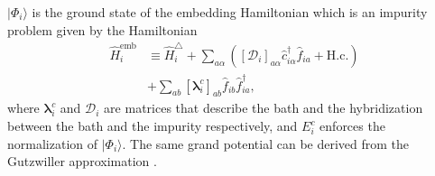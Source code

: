 \documentclass[reprint,aps,prb,amsmath,amssymb]{revtex4-2}
\begin{document}
%
$|\Phi_i\rangle$ is the ground state of the embedding Hamiltonian which is an impurity problem given by the Hamiltonian
%
\begin{align} \label{eq:ham-emb}
\hat{H}_i^{\mathrm{emb}} & \equiv \hat{H}_i^{\triangle} + \sum_{a\alpha} \left( [\bm{\mathcal{D}}_i]_{a\alpha} \hat{c}_{i\alpha}^{\dagger} \hat{f}_{ia}^{} + \mathrm{H.c.} \right) \nonumber \\
%
& + \sum_{ab} [\bm{\lambda}_i^c]_{ab} \hat{f}_{ib}^{} \hat{f}_{ia}^{\dagger},
\end{align}
%
where $\bm{\lambda}_i^c$ and $\bm{\mathcal{D}}_i$ are matrices that describe the bath and the hybridization between the bath and the impurity respectively, and $E_i^c$ enforces the normalization of $|\Phi_i \rangle$. The same grand potential can be derived from the Gutzwiller approximation \cite{Kotliar1986,Metzner1989,Bunemann2007,Lanata2008}.
\end{document}
